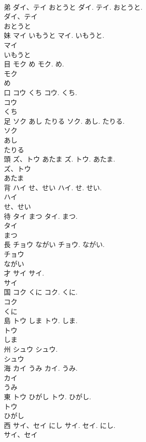 \documentclass[8pt]{extreport}
\begin{document}
\begin{CJK}{UTF8}{min}
\\	弟	ダイ、テイ おとうと	ダイ. テイ. おとうと.	
\\	ダイ、テイ
\\	おとうと
\\	妹	マイ いもうと	マイ. いもうと.	
\\	マイ
\\	いもうと
\\	目	モク め	モク. め.	
\\	モク
\\	め
\\	口	コウ くち	コウ. くち.	
\\	コウ
\\	くち
\\	足	ソク あし たりる	ソク. あし. たりる.	
\\	ソク
\\	あし
\\	たりる
\\	頭	ズ、トウ あたま	ズ. トウ. あたま.	
\\	ズ、トウ
\\	あたま
\\	背	ハイ せ、せい	ハイ. せ. せい.	
\\	ハイ
\\	せ、せい
\\	待	タイ まつ	タイ. まつ.	
\\	タイ
\\	まつ
\\	長	チョウ ながい	チョウ. ながい.	
\\	チョウ
\\	ながい
\\	才	サイ	サイ.	
\\	サイ
\\	国	コク くに	コク. くに.	
\\	コク
\\	くに
\\	島	トウ しま	トウ. しま.	
\\	トウ
\\	しま
\\	州	シュウ	シュウ.	
\\	シュウ
\\	海	カイ うみ	カイ. うみ.	
\\	カイ
\\	うみ
\\	東	トウ ひがし	トウ. ひがし.	
\\	トウ
\\	ひがし
\\	西	サイ、セイ にし	サイ. セイ. にし.	
\\	サイ、セイ

\end{CJK}
\end{document}

